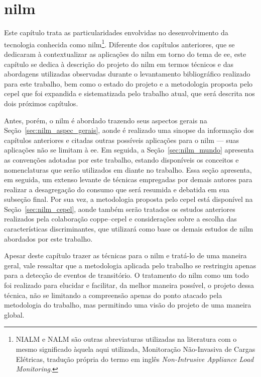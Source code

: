 \chapter[Monitoração Não-Invasiva de Cargas Elétricas]{\acrfull{nilm}}
\label{cap:nilm}

Este capítulo trata as particularidades envolvidas no
desenvolvimento da tecnologia conhecida como \gls{nilm}\footnote{NIALM
e NALM são outras abreviaturas utilizadas na literatura com o mesmo
significado àquela aqui utilizada, Monitoração
Não-Invasiva de Cargas Elétricas, tradução própria do
termo em inglês \emph{Non-Intrusive Appliance Load Monitoring}.}.
Diferente dos capítulos anteriores, que
se dedicaram à contextualizar as aplicações do \acs{nilm} em torno do
tema de \acs{ee}, este capítulo se dedica à descrição do projeto do
\acs{nilm} em termos técnicos e das abordagens utilizadas observadas
durante o levantamento bibliográfico realizado para este trabalho, bem
como o estado do projeto e a metodologia proposta pelo \acs{cepel} que
foi expandida e sistematizada pelo trabalho atual, que será descrita
nos dois próximos capítulos.

Antes, porém, o \acs{nilm} é abordado trazendo seus aspectos gerais na
Seção~\ref{sec:nilm_aspec_gerais}, aonde é realizado uma sinopse da
informação dos capítulos anteriores e citadas outras possíveis
aplicações para o \acs{nilm} --- suas aplicações não se limitam à
\acs{ee}. Em seguida, a Seção~\ref{sec:nilm_mundo} apresenta as
convenções adotadas por este trabalho, estando disponíveis os
conceitos e nomenclaturas que serão utilizados em diante no trabalho.
Essa seção apresenta, em seguida, um extenso levante de técnicas
empregadas por demais autores para realizar a desagregação do consumo
que será resumida e debatida em sua subseção final.  Por sua vez, a
metodologia proposta pelo \acs{cepel} está disponível na
Seção~\ref{sec:nilm_cepel}, aonde também serão tratados os estudos
anteriores realizados pela colaboração \acs{coppe}--\acs{cepel} e
considerações sobre a escolha das características discriminantes, que
utilizará como base os demais estudos de \acs{nilm} abordados por este
trabalho. 

Apesar deste capítulo trazer as técnicas para o \acs{nilm} e tratá-lo
de uma maneira geral, vale ressaltar que a metodologia aplicada pelo
trabalho se restringiu apenas para a detecção de eventos de
transitório. O tratamento do \acs{nilm} como um todo foi realizado
para elucidar e facilitar, da melhor maneira possível, o projeto dessa
técnica, não se limitando a compreensão apenas do ponto atacado pela
metodologia do trabalho, mas permitindo uma visão do projeto de uma
maneira global.


